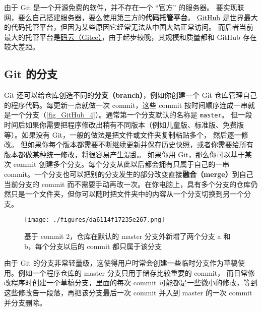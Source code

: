 由于 Git 是一个开源免费的软件，并不存在一个 “官方” 的服务器。 要实现联网，要么自己搭建服务器，要么使用第三方的\textbf{代码托管平台}。 \href{https://github.com/}{GitHub} 是世界最大的代码托管平台，但因为某些原因它经常无法从中国大陆正常访问。 而后者当前最大的托管平台是\href{https://gitee.com/}{码云（Gitee）}，由于起步较晚，其规模和质量都和 GitHub 存在较大差距。


\subsection{Git 的分支}
Git 还可以给仓库创造不同的\textbf{分支（branch）}，例如你创建一个 Git 仓库管理自己的程序代码。每更新一点就做一次 commit，这些 commit 按时间顺序连成一串就是一个分支（\autoref{fig_GitHub_4}）。通常第一个分支默认的名称是 \verb`master`。 但一段时间后如果你需要把程序修改出稍有不同版本（例如儿童版、标准版、免费版等）。如果没有 Git，一般的做法是把文件或文件夹复制粘贴多个， 然后逐一修改。 但如果你每个版本都需要不断继续更新并保存历史快照，或者你需要给所有版本都做某种统一修改，将很容易产生混乱。 如果你用 Git，那么你可以基于某次 commit 创建多个分支。每个分支从此以后都会拥有只属于自己的一串 commit。一个分支也可以把别的分支发生的部分改变直接\textbf{融合（merge）}到自己当前分支的 commit 而不需要手动再改一次。在你电脑上，具有多个分支的仓库仍然只是一个文件夹，但你可以随时把文件夹中的内容从一个分支切换到另一个分支。

\begin{figure}[ht]
\centering
\texttt{[image: ./figures/da6114f17235e267.png]}
\caption{基于 commit 2，仓库在默认的 master 分支外新增了两个分支 a 和 b，每个分支以后的 commit 都只属于该分支} \label{fig_GitHub_4}
\end{figure}

由于 Git 的分支非常轻量级，这使得用户时常会创建一些临时分支作为草稿使用。例如一个程序仓库的 master 分支只用于储存比较重要的 commit， 而日常修改程序时创建一个草稿分支，里面的每次 commit 可能都是一些微小的修改，等到这些修改告一段落，再把该分支最后一次 commit 并入到 master 的一次 commit 并分支删除。

